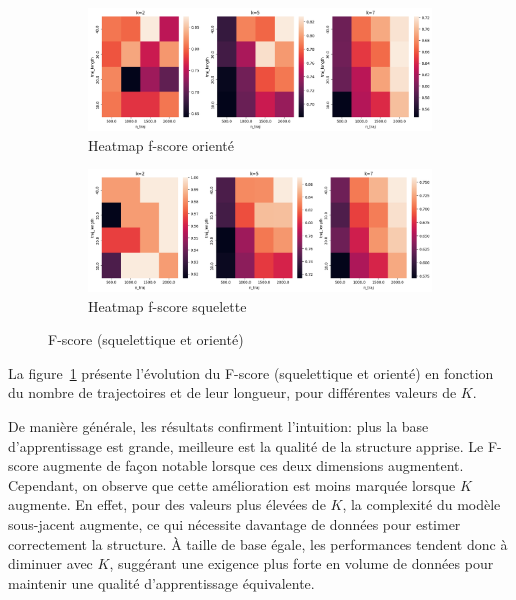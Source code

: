 \documentclass{article}
\begin{document}
\begin{figure}[ht]
    \centering
    \begin{subfigure}{\linewidth}
        \centering
        \includegraphics[width=\linewidth]{img/fscore.png}
        \caption{Heatmap f-score orienté}
    \end{subfigure}
    \begin{subfigure}{\linewidth}
        \centering
        \includegraphics[width=\linewidth]{img/sk-fscore.png}
        \caption{Heatmap f-score squelette }
    \end{subfigure}
    \caption{F-score (squelettique et orienté)}
    \label{fig:f-score}
\end{figure}


La figure~\ref{fig:f-score} présente l'évolution du F-score (squelettique et orienté) en fonction
du nombre de trajectoires et de leur longueur, pour différentes valeurs de $K$.

De manière générale, les résultats confirment l'intuition: plus la base d'apprentissage est grande,
meilleure est la qualité de la structure apprise. Le F-score augmente de façon notable lorsque ces deux dimensions
augmentent. Cependant, on observe que cette amélioration est moins marquée lorsque $K$ augmente. En effet,
pour des valeurs plus élevées de $K$, la complexité du modèle sous-jacent augmente, ce qui nécessite davantage de
données pour estimer correctement la structure. À taille de base égale, les performances tendent donc à diminuer
avec $K$, suggérant une exigence plus forte en volume de données pour maintenir une qualité d'apprentissage équivalente.
\end{document}

